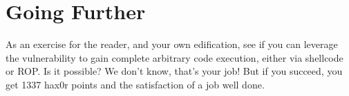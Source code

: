 \documentclass[10.9pt]{article}
\newcommand\tab[1][0.5cm]{\hspace*{#1}}
\begin{document}
\section{Going Further}
\tab As an exercise for the reader, and your own edification, see if you can leverage the vulnerability to gain complete arbitrary code execution, either via shellcode or ROP. Is it possible? We don’t know, that’s your job! But if you succeed, you get 1337 hax0r points and the satisfaction of a job well done.
\end{document}
